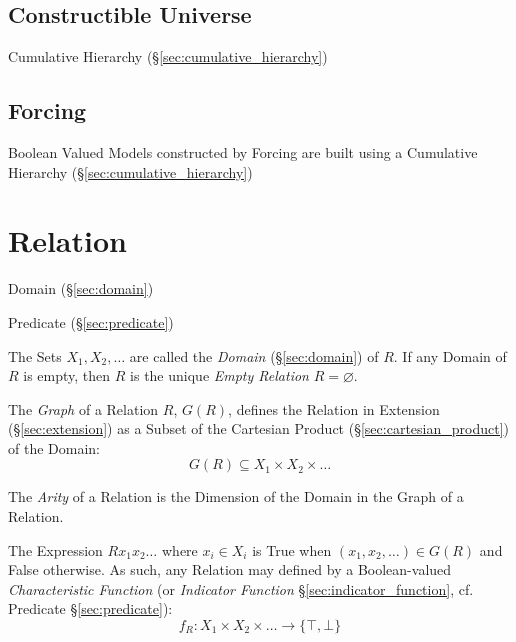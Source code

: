 


\subsection{Constructible Universe}\label{sec:constrictible_universe}

Cumulative Hierarchy (\S\ref{sec:cumulative_hierarchy})



\subsection{Forcing}\label{sec:forcing}

Boolean Valued Models constructed by Forcing are built using a
Cumulative Hierarchy (\S\ref{sec:cumulative_hierarchy})



\section{Relation}\label{sec:set_relation}

Domain (\S\ref{sec:domain})

Predicate (\S\ref{sec:predicate})

The Sets $X_1, X_2, \ldots$ are called the \emph{Domain}
(\S\ref{sec:domain}) of $R$. If any Domain of $R$ is empty, then $R$
is the unique \emph{Empty Relation} $R = \varnothing$.

The \emph{Graph} of a Relation $R$, $G(R)$, defines the Relation in
Extension (\S\ref{sec:extension}) as a Subset of the Cartesian Product
(\S\ref{sec:cartesian_product}) of the Domain:
\[
  G(R) \subseteq X_1 \times X_2 \times \ldots
\]

The \emph{Arity} of a Relation is the Dimension of the Domain in the
Graph of a Relation. %

The Expression $R x_1 x_2 \ldots$ where $x_i \in X_i$ is True when
$(x_1, x_2, \ldots) \in G(R)$ and False otherwise. As such, any
Relation may defined by a Boolean-valued \emph{Characteristic
  Function} (or \emph{Indicator Function}
\S\ref{sec:indicator_function}, cf. Predicate \S\ref{sec:predicate}):
\[
  f_R : X_1 \times X_2 \times \ldots \rightarrow \{\top,\bot\}
\]


